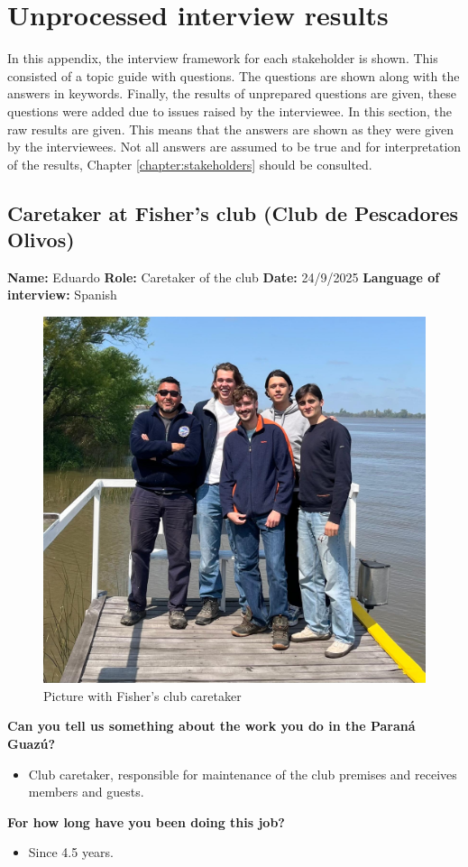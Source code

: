 \chapter{Unprocessed interview results}
\label{chap:interviews}
In this appendix, the interview framework for each stakeholder is shown. This consisted of a topic guide with questions. The questions are shown along with the answers in keywords. Finally, the results of unprepared questions are given, these questions were added due to issues raised by the interviewee. In this section, the raw results are given. This means that the answers are shown as they were given by the interviewees. Not all answers are assumed to be true and for interpretation of the results, Chapter \ref{chapter:stakeholders} should be consulted.

\section{Caretaker at Fisher's club (Club de Pescadores Olivos)}
\textbf{Name:} Eduardo \newline
\textbf{Role:} Caretaker of the club \newline
\textbf{Date:} 24/9/2025 \newline
\textbf{Language of interview:} Spanish

\begin{figure}[H]
    \centering
    \includegraphics[width=0.4\linewidth]{figures/appendixE/InterviewFisher.jpeg}
    \caption{Picture with Fisher's club caretaker}
\end{figure}

\textbf{Can you tell us something about the work you do in the Paraná Guazú?}
\begin{itemize}
    \item Club caretaker, responsible for maintenance of the club premises and receives members and guests.
\end{itemize}

\textbf{For how long have you been doing this job?}
\begin{itemize}
    \item Since 4.5 years.
\end{itemize}

